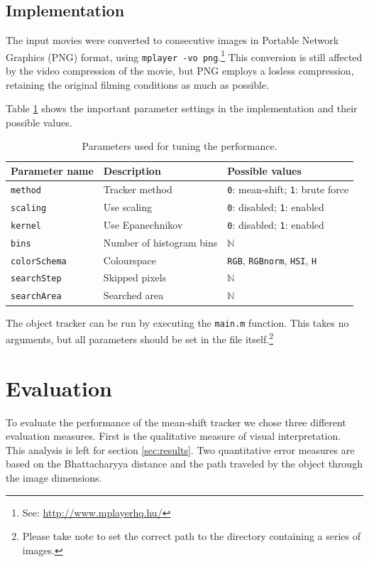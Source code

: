\documentclass[a4paper,11pt]{article}
\begin{document}
\subsection{Implementation}
\label{sec:application:implementation}
The input movies were converted to consecutive images in Portable Network Graphics (PNG) format, using \texttt{mplayer -vo png}.\footnote{See: \url{http://www.mplayerhq.hu/}}
This conversion is still affected by the video compression of the movie, but PNG employs a losless compression, retaining the original filming conditions as much as possible.

Table \ref{tab:parameters} shows the important parameter settings in the implementation and their possible values.

\begin{table}[ht]
  \centering
  \begin{tabular}{|l||l|l|}
    \hline
    Parameter name & Description & Possible values\\
    \hline
    \texttt{method} & Tracker method & \texttt{0}: mean-shift; \texttt{1}: brute force\\
    \texttt{scaling} & Use scaling & \texttt{0}: disabled; \texttt{1}: enabled\\
    \texttt{kernel} & Use Epanechnikov & \texttt{0}: disabled; \texttt{1}: enabled\\
    \texttt{bins} & Number of histogram bins & $\mathbb{N}$\\
    \texttt{colorSchema} & Colourspace & \texttt{RGB}, \texttt{RGBnorm}, \texttt{HSI}, \texttt{H}\\
    \texttt{searchStep} & Skipped pixels & $\mathbb{N}$\\
    \texttt{searchArea} & Searched area & $\mathbb{N}$\\
    \hline
  \end{tabular}
  \caption{Parameters used for tuning the performance.}
  \label{tab:parameters}
\end{table}

The object tracker can be run by executing the \texttt{main.m} function.
This takes no arguments, but all parameters should be set in the file itself.\footnote{Please take note to set the correct path to the directory containing a series of images.}


\section{Evaluation}
\label{sec:evaluation}
To evaluate the performance of the mean-shift tracker we chose three different evaluation measures.
First is the qualitative measure of visual interpretation.
This analysis is left for section \ref{sec:results}.
Two quantitative error measures are based on the Bhattacharyya distance and the path traveled by the object through the image dimensions.
\end{document}
